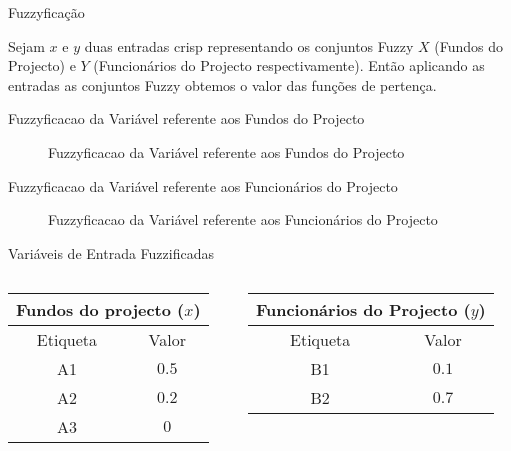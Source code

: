 \documentclass[portuges]{beamer}
\begin{document}
\begin{frame}{Fuzzyficação}
	\begin{example}
		Sejam $x$ e $y$ duas entradas crisp representando os conjuntos Fuzzy $X$ (Fundos do Projecto)
		e $Y$ (Funcionários do Projecto respectivamente). Então aplicando as entradas as conjuntos Fuzzy obtemos o valor
		das funções de pertença.
	\end{example}

	
\end{frame}

\begin{frame}{Fuzzyficacao da Variável referente aos Fundos do Projecto}
	\begin{figure}
			\centering
			\caption{Fuzzyficacao da Variável referente aos Fundos do Projecto}
		\end{figure}		
\end{frame}

\begin{frame}{Fuzzyficacao da Variável referente aos Funcionários do Projecto}
	\begin{figure}
			\centering
			\caption{Fuzzyficacao da Variável referente aos Funcionários do Projecto}
		\end{figure}		
\end{frame}

\begin{frame}{Variáveis de Entrada Fuzzificadas}
	\begin{columns}
	\begin{column}{5cm}
	\begin{tabular}{c|c} 
		\hline
		\multicolumn{2}{c}{{\textbf{Fundos do projecto ($x$)}}}\\ 
		\hline
		Etiqueta & Valor \\ \hline
		 A1 & $0.5$ \\
		A2  & $0.2$ \\ 
		A3 & $0$ \\ \hline
	\end{tabular}
	\end{column}
	\begin{column}{5cm}
	\begin{tabular}{c|c} 
		\hline
		\multicolumn{2}{c}{{\textbf{Funcionários do Projecto ($y$)}}}\\ 
		\hline
		Etiqueta & Valor \\ \hline
		 B1 & $0.1$ \\ 
		 B2 & $0.7$ \\ \hline
	\end{tabular}
	\end{column}
	\end{columns}
\end{frame}
\end{document}
